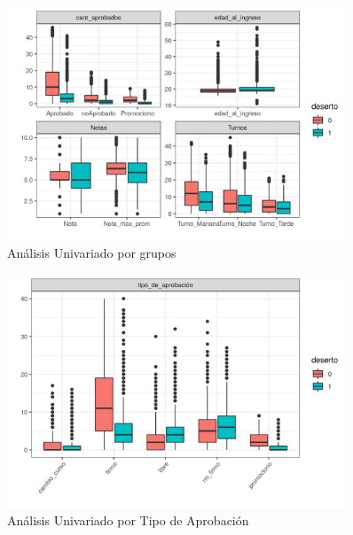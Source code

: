 









\FloatBarrier





\begin{figure}[!htb]
	\centering
	\includegraphics[width=0.9\textwidth]{imagenes/imagenes/gg_explo_tablon_grupo.png}
	\caption{Análisis Univariado por grupos}
	\label{fig:tablon_boxplot_grupo}
\end{figure}

\begin{figure}[!htb]
	\centering
	\includegraphics[width=0.9\textwidth]{imagenes/imagenes/gg_explo_tablon_tipo_aprob.png}
	\caption{Análisis Univariado por Tipo de Aprobación}
	\label{fig:tablon_boxplot_tipoAprobacion}
\end{figure}

